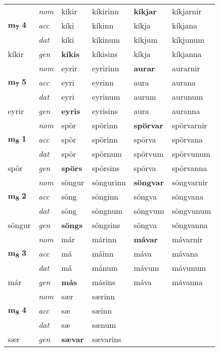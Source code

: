 \begin{longtable}[l]{X>{\footnotesize\itshape}XXXXX}
\multirow{3}{*}{{{\textbf{m{\textsubscript{7}}} \Large{\textbf{4}}}}} & nom & kíkir & kíkirinn & \textbf{kíkjar} & kíkjarnir \\*
 & acc & kíki & kíkinn & kíkja & kíkjana \\*
 & dat & kíki & kíkinum & kíkjum & kíkjunum \\*
 {\footnotesize{kíkir}} & gen & \textbf{kíkis} & kíkisins & kíkja & kíkjanna \\
\cmidrule{1-6}

\multirow{3}{*}{{{\textbf{m{\textsubscript{7}}} \Large{\textbf{5}}}}} & nom & eyrir & eyririnn & \textbf{aurar} & aurarnir \\*
 & acc & eyri & eyrinn & aura & aurana \\*
 & dat & eyri & eyrinum & aurum & aurunum \\*
 {\footnotesize{eyrir}} & gen & \textbf{eyris} & eyrisins & aura & auranna \\
\cmidrule{1-6}

\multirow{3}{*}{{{\textbf{m{\textsubscript{8}}} \Large{\textbf{1}}}}} & nom & spör & spörinn & \textbf{spörvar} & spörvarnir \\*
 & acc & spör & spörinn & spörva & spörvana \\*
 & dat & spör & spörnum & spörvum & spörvunum \\*
 {\footnotesize{spör}} & gen & \textbf{spörs} & spörsins & spörva & spörvanna \\
\cmidrule{1-6}

\multirow{3}{*}{{{\textbf{m{\textsubscript{8}}} \Large{\textbf{2}}}}} & nom & söngur & söngurinn & \textbf{söngvar} & söngvarnir \\*
 & acc & söng & sönginn & söngva & söngvana \\*
 & dat & söng & söngnum & söngvum & söngvunum \\*
 {\footnotesize{söngur}} & gen & \textbf{söngs} & söngsins & söngva & söngvanna \\
\cmidrule{1-6}

\multirow{3}{*}{{{\textbf{m{\textsubscript{8}}} \Large{\textbf{3}}}}} & nom & már & márinn & \textbf{mávar} & mávarnir \\*
 & acc & má & máinn & máva & mávana \\*
 & dat & má & mánum & mávum & mávunum \\*
 {\footnotesize{már}} & gen & \textbf{más} & másins & máva & mávanna \\
\cmidrule{1-6}

\multirow{3}{*}{{{\textbf{m{\textsubscript{8}}} \Large{\textbf{4}}}}} & nom & sær & særinn & \textbf{} &  \\*
 & acc & sæ & sæinn &  &  \\*
 & dat & sæ & sænum &  &  \\*
 {\footnotesize{sær}} & gen & \textbf{sævar} & sævarins &  &  \\
\cmidrule{1-6}


\end{longtable}
